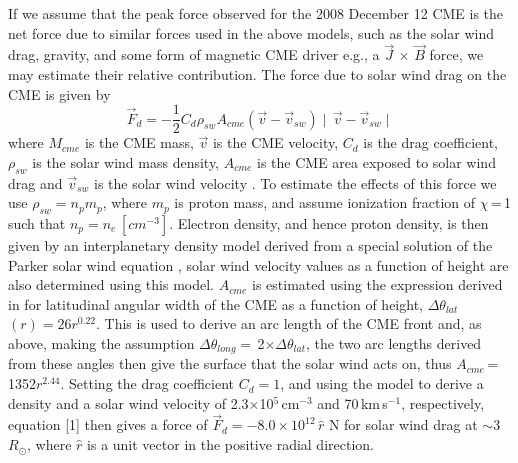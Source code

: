 If we assume that the peak force observed for the 2008 December 12 CME is the net force due to similar forces used in the above models, such as the solar wind drag, gravity, and some form of magnetic CME driver e.g., a $\vec{J}\,\times\,\vec{B}$ force, we may estimate their relative contribution. The force due to solar wind drag on the CME is given by
\begin{equation}
\vec{F}_d=-\frac{1}{2}C_{d}\rho_{sw}A_{cme}(\vec{v}-\vec{v}_{sw})\mid\,\vec{v}-\vec{v}_{sw}\mid
\end{equation}
where $M_{cme}$ is the CME mass, $\vec{v}$ is the CME velocity, $C_{d}$ is the drag coefficient, $\rho_{sw}$ is the solar wind mass density, $A_{cme}$ is the CME area exposed to solar wind drag and $\vec{v}_{sw}$ is the solar wind velocity \citep{malo10}. To estimate the effects of this force we use $\rho_{sw}=n_{p}m_{p}$, where $m_{p}$ is proton mass, and assume ionization fraction of $\chi$\,=\,1 such that $n_{p}=n_{e}$\,$[cm^{-3}]$. Electron density, and hence proton density, is then given by an interplanetary density model derived from a special solution of the Parker solar wind equation \citep{Mann1999}, solar wind velocity values as a function of height are also determined using this model. $A_{cme}$ is estimated using the expression derived in \citet{byr10} for latitudinal angular width of the CME as a function of height, $\Delta$$\theta_{lat}$$(r)=26r^{0.22}$. This is used to derive an arc length of the CME front and, as above, making the assumption $\Delta$$\theta_{long}$$=$\,2$\times$$\Delta$$\theta_{lat}$, the two arc lengths derived from these angles then give the surface that the solar wind acts on, thus $A_{cme}$\,=\,1352$r^{2.44}$. Setting the drag coefficient $C_{d}=1$, and using the \citet{Mann1999} model to derive a density and a solar wind velocity of 2.3$\times$10$^{5}$\,cm$^{-3}$  and 70\,km\,s$^{-1}$, respectively, equation [1] then gives a force of $\vec{F}_{d}=-8.0\times10^{12}\,\hat{r}\,$\,N for solar wind drag at $\sim$3\,$R_{\odot}$, where $\hat{r}$ is a unit vector in the positive radial direction. 

